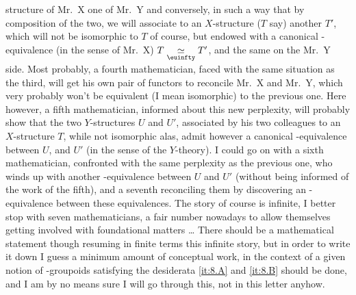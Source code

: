 structure of Mr.\ X one of Mr.\ Y and conversely, in such a way that
by composition of the two, we will associate to an $X$-structure ($T$
say) another $T'$, which will not be isomorphic to $T$ of course, but
endowed with a canonical \oo-equivalence (in the sense of Mr.\ X) $T
\underset{\oo}{\simeq} T'$, and the same on the Mr.\ Y side. Most
probably, a fourth mathematician, faced with the same situation as the
third, will get his own pair of functors to reconcile Mr.\ X and Mr.\
Y, which very probably won't be equivalent (I mean isomorphic) to the
previous one. Here however, a fifth mathematician, informed about this
new perplexity, will probably show that the two $Y$-structures $U$ and
$U'$, associated by his two colleagues to an $X$-structure $T$, while
not isomorphic alas, admit however a canonical \oo-equivalence between
$U$, and $U'$ (in the sense of the $Y$-theory). I could go on with a
sixth mathematician, confronted with the same perplexity as the
previous one, who winds up with another \oo-equivalence between $U$
and $U'$ (without being informed of the work of the fifth), and a
seventh reconciling them by discovering an \oo-equivalence between
these equivalences. The story of course is infinite, I better stop
with seven mathematicians, a fair number nowadays to allow themselves
getting involved with foundational matters \ldots
There should be a mathematical statement though resuming in finite
terms this infinite story, but in order to write it down I guess a
minimum amount of conceptual work, in the context of a given notion of
\oo-groupoids satisfying the desiderata \ref{it:8.A} and \ref{it:8.B}
should be done, and I am by no means sure I will go through this, not
in this letter anyhow.

